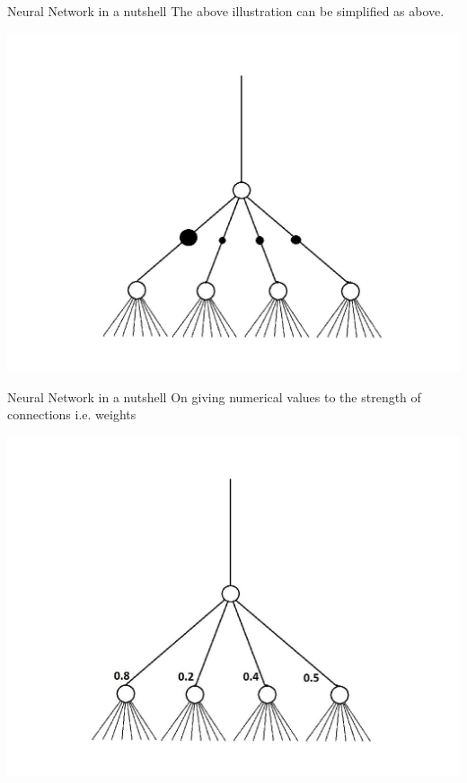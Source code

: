 \documentclass[10pt]{beamer}
\begin{document}
	\begin{frame}[c]{Neural Network in a nutshell}
		\large{The above illustration can be simplified as above.}
			\begin{center}
				\includegraphics[width=0.9\linewidth]{images/sonn6}
			\end{center}
	\end{frame}
	\begin{frame}[c]{Neural Network in a nutshell}
		\large{On giving numerical values to the strength of connections i.e. weights}
			\begin{center}
				\includegraphics[width=0.9\linewidth]{images/sonn7}
			\end{center}
	\end{frame}
\end{document}
